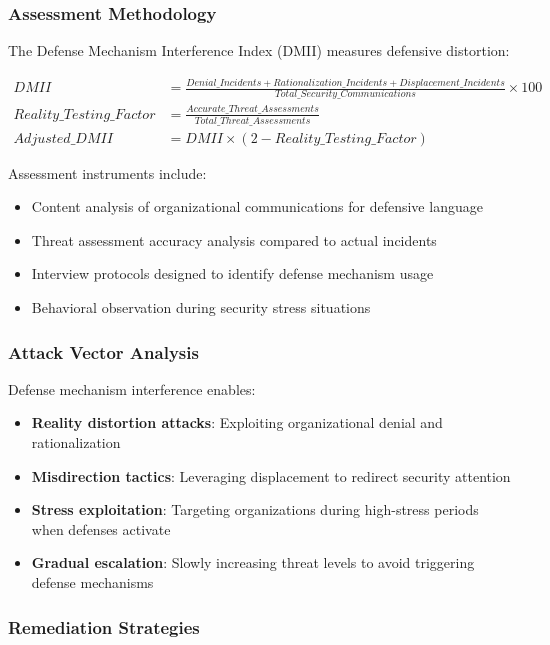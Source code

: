 \documentclass[11pt,a4paper]{article}
\begin{document}
\subsubsection{Assessment Methodology}

The Defense Mechanism Interference Index (DMII) measures defensive distortion:

\begin{align}
DMII &= \frac{Denial\_Incidents + Rationalization\_Incidents + Displacement\_Incidents}{Total\_Security\_Communications} \times 100 \\
Reality\_Testing\_Factor &= \frac{Accurate\_Threat\_Assessments}{Total\_Threat\_Assessments} \\
Adjusted\_DMII &= DMII \times (2 - Reality\_Testing\_Factor)
\end{align}

Assessment instruments include:
\begin{itemize}
\item Content analysis of organizational communications for defensive language
\item Threat assessment accuracy analysis compared to actual incidents
\item Interview protocols designed to identify defense mechanism usage
\item Behavioral observation during security stress situations
\end{itemize}

\subsubsection{Attack Vector Analysis}

Defense mechanism interference enables:

\begin{itemize}
\item \textbf{Reality distortion attacks}: Exploiting organizational denial and rationalization
\item \textbf{Misdirection tactics}: Leveraging displacement to redirect security attention
\item \textbf{Stress exploitation}: Targeting organizations during high-stress periods when defenses activate
\item \textbf{Gradual escalation}: Slowly increasing threat levels to avoid triggering defense mechanisms
\end{itemize}

\subsubsection{Remediation Strategies}
\end{document}
